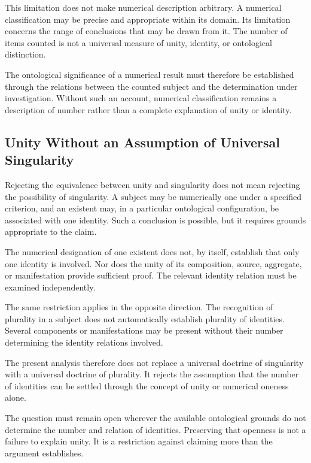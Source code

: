 This limitation does not make numerical
description arbitrary. A numerical
classification may be precise and
appropriate within its domain. Its
limitation concerns the range of
conclusions that may be drawn from it.
The number of items counted is not
a universal measure of unity, identity,
or ontological distinction.

The ontological significance of a
numerical result must therefore be
established through the relations
between the counted subject and the
determination under investigation.
Without such an account, numerical
classification remains a description
of number rather than a complete
explanation of unity or identity.

\subsection{Unity Without an Assumption of Universal Singularity}

Rejecting the equivalence between unity
and singularity does not mean rejecting
the possibility of singularity. A subject
may be numerically one under a specified
criterion, and an existent may, in a
particular ontological configuration,
be associated with one identity. Such
a conclusion is possible, but it requires
grounds appropriate to the claim.

The numerical designation of one existent
does not, by itself, establish that only
one identity is involved. Nor does the
unity of its composition, source, aggregate,
or manifestation provide sufficient proof.
The relevant identity relation must be
examined independently.

The same restriction applies in the
opposite direction. The recognition
of plurality in a subject does not
automatically establish plurality of
identities. Several components or
manifestations may be present without
their number determining the identity
relations involved.

The present analysis therefore does
not replace a universal doctrine of
singularity with a universal doctrine
of plurality. It rejects the assumption
that the number of identities can be
settled through the concept of unity
or numerical oneness alone.

The question must remain open wherever
the available ontological grounds do
not determine the number and relation
of identities. Preserving that openness
is not a failure to explain unity. It
is a restriction against claiming more
than the argument establishes.

